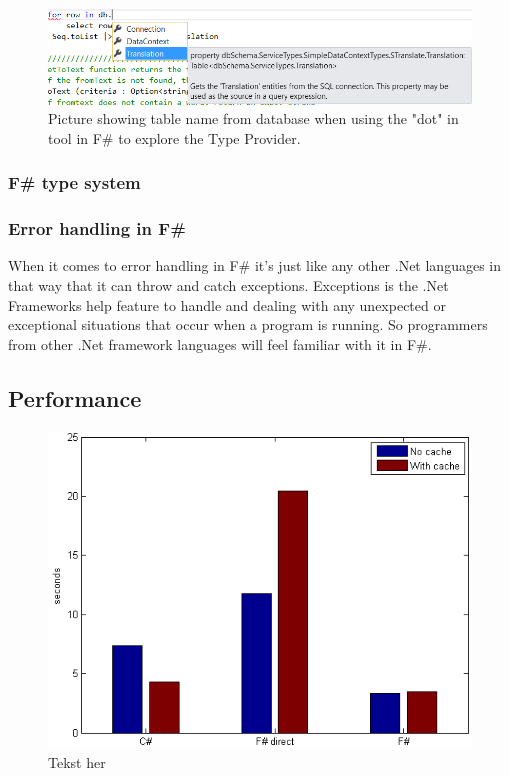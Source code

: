 \documentclass[12pt, a4paper]{article}
\begin{document}
\begin{figure}[!h]
    \includegraphics[width=\textwidth]{visualstudio1}
    \centering
    \caption{Picture showing table name from database when using the "dot" in tool in F\# to explore the Type Provider.}
    \label{fig:DotInTool}
\end{figure}

\subsubsection{F\# type system}

\subsubsection{Error handling in F\#}
When it comes to error handling in F\# it's just like any other .Net languages in that way that it can throw and catch exceptions. Exceptions is the .Net Frameworks help feature to handle and dealing with any unexpected or exceptional situations that occur when a program is running. So programmers from other .Net framework languages will feel familiar with it in F\#. \\

\newpage
\subsection{Performance}

\begin{figure}[!h]
    \includegraphics[scale=0.8]{averageChart1}
    \centering

    \caption{Tekst her}
\end{figure}
\end{document}
